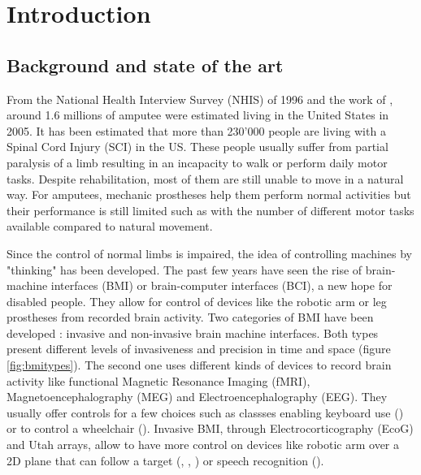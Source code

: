 \documentclass[preprint,12pt]{elsarticle}
\begin{document}
\linenumbers

\section{Introduction}
\label{S:1}
\subsection{Background and state of the art}

From the National Health Interview Survey (NHIS) of 1996 and the work of \citet{Ziegler-Graham2008}, around 1.6 millions of amputee were estimated living in the United States in 2005. It has been estimated that more than 230'000 people are living with a Spinal Cord Injury (SCI) in the US. These people usually suffer from partial paralysis of a limb resulting in an incapacity to walk or perform daily motor tasks. Despite rehabilitation, most of them are still unable to move in a natural way. For amputees, mechanic prostheses help them perform normal activities but their performance is still limited such as with the number of different motor tasks available compared to natural movement.

Since the control of normal limbs is impaired, the idea of controlling machines by "thinking" has been developed. The past few years have seen the rise of brain-machine interfaces (BMI) or brain-computer interfaces (BCI), a new hope for disabled people. They allow for control of devices like the robotic arm or leg prostheses from recorded brain activity. Two categories of BMI have been developed : invasive and non-invasive brain machine interfaces. Both types present different levels of invasiveness and precision in time and space (figure \ref{fig:bmitypes}). The second one uses different kinds of devices to record brain activity like functional Magnetic Resonance Imaging (fMRI), Magnetoencephalography (MEG) and Electroencephalography (EEG). They usually offer controls for a few choices such as classses enabling keyboard use (\citet{Orhan2012}) or to control a wheelchair (\citet{DelRMillan2009}). Invasive BMI, through Electrocorticography (EcoG) and Utah arrays, allow to have more control on devices like robotic arm over a 2D plane that can follow a target (\citet{Carmena2003}, \citet{Collinger2013}, \citet{Musallam2004}) or speech recognition (\citet{Brumberg2011}). 
\end{document}
